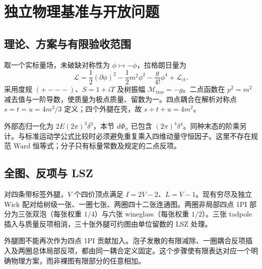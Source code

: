 \documentclass[11pt,a4paper,oneside]{ctexart}
\theoremstyle{cnplain}
\theoremstyle{definition}
\theoremstyle{remark}
\numberwithin{equation}{section}
\begin{document}
\endgroup

\section{独立物理基准与开放问题}\label{ch:physics}

\begingroup


\subsection{理论、方案与有限验收范围}
取一个实标量场，未破缺对称性为 $\phi\mapsto-\phi$，拉格朗日量为
\begin{equation}
 \mathcal L=\frac12(\partial\phi)^2-\frac12m^2\phi^2
 -\frac{g}{4!}\phi^4+\mathcal L_{\mathrm{ct}}.
\end{equation}
采用度规 $(+---)$、$S=1+iT$ 及树振幅 $\mathcal M_{\mathrm{tree}}=-g$。二点函数在 $p^2=m^2$ 减去值与一阶导数，使质量为极点质量、留数为一。四点耦合在解析对称点 $s=t=u=4m^2/3$ 定义；四个外腿在壳，故 $s+t+u=4m^2$。

外部态归一化为 $2E(2\pi)^3\delta^3$，本节 $d\Phi_n$ 已包含 $(2\pi)^4\delta^4$。同种末态的阶乘另计。与标准运动学公式\cite{pdg}比较时必须避免重复乘入四维动量守恒因子。这里不存在规范 Ward 恒等式；分子只有标量常数及规定的二点反项。


\subsection{全图、反项与 LSZ}
对四条带标签外腿，$V$ 个四价顶点满足 $I=2V-2$、$L=V-1$。现有穷尽及独立 Wick 配对给树级一张、一圈七张、两圈四十二张连通图。两圈非局部四点 1PI 部分为三张双泡（每张权重 $1/4$）与六张 wineglass（每张权重 $1/2$）。三张 tadpole 插入与质量反项相消，三十张外腿可约图由单位留数的 LSZ 处理。

外腿图不能再次作为四点 1PI 贡献加入。泡子发散的有限减除、一圈耦合反项插入及两圈总体局部反项，都由同一耦合定义固定。这个步骤使有限表达对应一个明确物理方案，而非裸图有限部分的任意相加。
\end{document}
